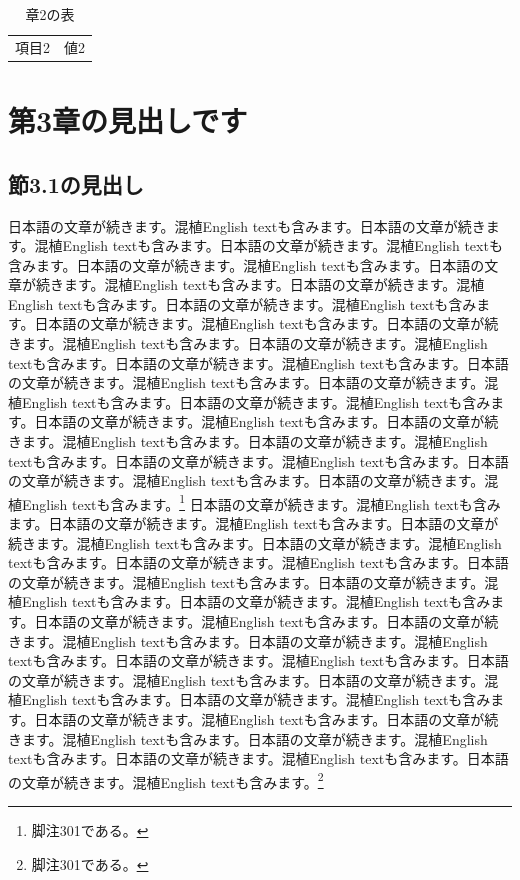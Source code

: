 \documentclass[pdflatex,book]{jlreq}
\begin{document}
\begin{table}[htbp]\centering\caption{章2の表}\begin{tabular}{cc}項目2 & 値2\\\end{tabular}\end{table}

\chapter{第3章の見出しです}
\section{節3.1の見出し}
日本語の文章が続きます。混植English textも含みます。日本語の文章が続きます。混植English textも含みます。日本語の文章が続きます。混植English textも含みます。日本語の文章が続きます。混植English textも含みます。日本語の文章が続きます。混植English textも含みます。日本語の文章が続きます。混植English textも含みます。日本語の文章が続きます。混植English textも含みます。日本語の文章が続きます。混植English textも含みます。日本語の文章が続きます。混植English textも含みます。日本語の文章が続きます。混植English textも含みます。日本語の文章が続きます。混植English textも含みます。日本語の文章が続きます。混植English textも含みます。日本語の文章が続きます。混植English textも含みます。日本語の文章が続きます。混植English textも含みます。日本語の文章が続きます。混植English textも含みます。日本語の文章が続きます。混植English textも含みます。日本語の文章が続きます。混植English textも含みます。日本語の文章が続きます。混植English textも含みます。日本語の文章が続きます。混植English textも含みます。日本語の文章が続きます。混植English textも含みます。\footnote{脚注301である。}
日本語の文章が続きます。混植English textも含みます。日本語の文章が続きます。混植English textも含みます。日本語の文章が続きます。混植English textも含みます。日本語の文章が続きます。混植English textも含みます。日本語の文章が続きます。混植English textも含みます。日本語の文章が続きます。混植English textも含みます。日本語の文章が続きます。混植English textも含みます。日本語の文章が続きます。混植English textも含みます。日本語の文章が続きます。混植English textも含みます。日本語の文章が続きます。混植English textも含みます。日本語の文章が続きます。混植English textも含みます。日本語の文章が続きます。混植English textも含みます。日本語の文章が続きます。混植English textも含みます。日本語の文章が続きます。混植English textも含みます。日本語の文章が続きます。混植English textも含みます。日本語の文章が続きます。混植English textも含みます。日本語の文章が続きます。混植English textも含みます。日本語の文章が続きます。混植English textも含みます。日本語の文章が続きます。混植English textも含みます。日本語の文章が続きます。混植English textも含みます。\footnote{脚注301である。}
\end{document}
